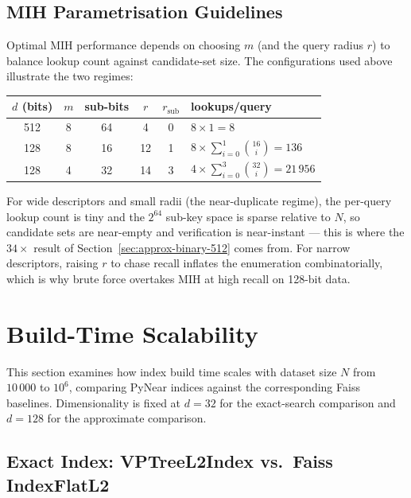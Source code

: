 \documentclass[11pt,a4paper]{article}
\begin{document}
\subsection{MIH Parametrisation Guidelines}
\label{sec:mih-params}

Optimal MIH performance depends on choosing $m$ (and the query radius $r$)
to balance lookup count against candidate-set size.  The configurations
used above illustrate the two regimes:

\begin{center}
\renewcommand{\arraystretch}{1.2}
\begin{tabular}{cccccl}
\toprule
$d$ (bits) & $m$ & sub-bits & $r$ & $r_{\mathrm{sub}}$ & lookups/query \\
\midrule
512 & 8 & 64 & 4 & 0 & $8 \times 1 = 8$ \\
128 & 8 & 16 & 12 & 1 & $8 \times \sum_{i=0}^{1}\binom{16}{i} = 136$ \\
128 & 4 & 32 & 14 & 3 & $4 \times \sum_{i=0}^{3}\binom{32}{i} = 21\,956$ \\
\bottomrule
\end{tabular}
\end{center}

For wide descriptors and small radii (the near-duplicate regime), the
per-query lookup count is tiny and the $2^{64}$ sub-key space is sparse
relative to $N$, so candidate sets are near-empty and verification is
near-instant — this is where the $34\times$ result of
Section~\ref{sec:approx-binary-512} comes from.  For narrow descriptors,
raising $r$ to chase recall inflates the enumeration combinatorially,
which is why brute force overtakes MIH at high recall on 128-bit data.

\section{Build-Time Scalability}
\label{sec:build-scale}

This section examines how index build time scales with dataset size $N$ from
$10\,000$ to $10^6$, comparing PyNear indices against the corresponding Faiss
baselines.  Dimensionality is fixed at $d = 32$ for the exact-search
comparison and $d = 128$ for the approximate comparison.

\subsection{Exact Index: VPTreeL2Index vs.\ Faiss IndexFlatL2}
\label{sec:build-exact}
\end{document}
